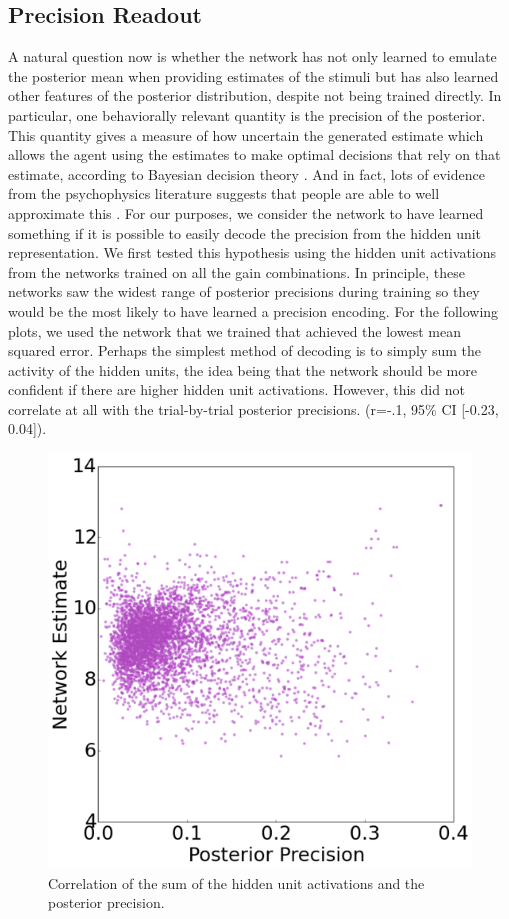 \documentclass{article} %
\begin{document}
\subsection{Precision Readout}
A natural question now is whether the network has not only learned to emulate the posterior mean when providing estimates of the stimuli but has also learned other features of the posterior distribution, despite not being trained directly. In particular, one behaviorally relevant quantity is the precision of the posterior. This quantity gives a measure of how uncertain the generated estimate which allows the agent using the estimates to make optimal decisions that rely on that estimate, according to Bayesian decision theory \cite{?}. And in fact, lots of evidence from the psychophysics literature suggests that people are able to well approximate this \cite{Qamar10122013}. For our purposes, we consider the network to have learned something if it is possible to easily decode the precision from the hidden unit representation.  We first tested this hypothesis using the hidden unit activations from the networks trained on all the gain combinations. In principle, these networks saw the widest range of posterior precisions during training so they would be the most likely to have learned a precision encoding. For the following plots, we used the network that we trained that achieved the lowest mean squared error. Perhaps the simplest method of decoding is to simply sum the activity of the hidden units, the idea being that the network should be more confident if there are higher hidden unit activations. However, this did not correlate at all with the trial-by-trial posterior precisions.  (r=-.1, 95\% CI [-0.23, 0.04]). 
\begin{figure}[h]
\centering
\includegraphics[width = .5\textwidth]{Sum_Precisions.png}
\caption{Correlation of the sum of the hidden unit activations and the posterior precision.}
\end{figure}
\end{document}
